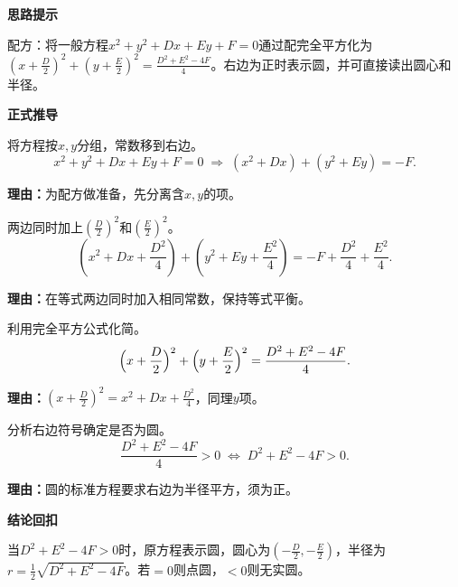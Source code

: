 \begin{proofbox}
	\textbf{\textcolor{CProof}{思路提示}}

	配方：将一般方程$x^2+y^2+Dx+Ey+F=0$通过配完全平方化为$(x+\frac{D}{2})^2+(y+\frac{E}{2})^2=\frac{D^2+E^2-4F}{4}$。右边为正时表示圆，并可直接读出圆心和半径。

	\medskip
	\textbf{\textcolor{CProof}{正式推导}}
	\begin{description}[style=nextline, leftmargin=2.8em, labelsep=0.5em, itemsep=0.55em]
		\item[\textbf{步骤一（移项分组）：}]将方程按$x,y$分组，常数移到右边。
			\[
				x^2+y^2+Dx+Ey+F=0 \;\Longrightarrow\; (x^2+Dx)+(y^2+Ey) = -F.
			\]
			\par\textbf{理由：}为配方做准备，先分离含$x,y$的项。

		\item[\textbf{步骤二（加项配方）：}]两边同时加上$(\frac{D}{2})^2$和$(\frac{E}{2})^2$。
			\[
				(x^2+Dx+\frac{D^2}{4})+(y^2+Ey+\frac{E^2}{4}) = -F+\frac{D^2}{4}+\frac{E^2}{4}.
			\]
			\par\textbf{理由：}在等式两边同时加入相同常数，保持等式平衡。

		\item[\textbf{步骤三（完全平方）：}]利用完全平方公式化简。
			\[
				\Bigl(x+\frac{D}{2}\Bigr)^2+\Bigl(y+\frac{E}{2}\Bigr)^2 = \frac{D^2+E^2-4F}{4}.
			\]
			\par\textbf{理由：}$(x+\frac{D}{2})^2 = x^2+Dx+\frac{D^2}{4}$，同理$y$项。

		\item[\textbf{步骤四（条件分析）：}]分析右边符号确定是否为圆。
			\[
				\frac{D^2+E^2-4F}{4}>0 \;\iff\; D^2+E^2-4F>0.
			\]
			\par\textbf{理由：}圆的标准方程要求右边为半径平方，须为正。
	\end{description}

	\medskip
	\textbf{\textcolor{CProof}{结论回扣}}

	当$D^2+E^2-4F>0$时，原方程表示圆，圆心为$(-\frac{D}{2},-\frac{E}{2})$，半径为$r=\frac12\sqrt{D^2+E^2-4F}$。若$=0$则点圆，$<0$则无实圆。
\end{proofbox}
